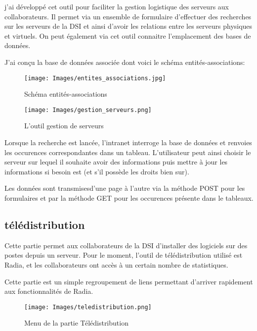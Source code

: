 j'ai développé cet outil pour faciliter la gestion logistique des
serveurs aux collaborateurs. Il permet via un ensemble de formulaire
d'effectuer des recherches sur les serveurs de la DSI et ainsi d'avoir
les relations entre les serveurs physiques et virtuels. On peut
également via cet outil connaitre l'emplacement des bases de données.

J'ai conçu la base de données associée dont voici le schéma entités-associations:

\begin{figure}[h]
\begin{center}
\texttt{[image: Images/entites\_associations.jpg]}
\caption{Schéma entités-associations}
\label{Schéma entités-associations}
\end{center}
\end{figure}

\begin{figure}[h]
\begin{center}
\texttt{[image: Images/gestion\_serveurs.png]}
\caption{L'outil gestion de serveurs}
\label{L'outil gestion de serveurs}
\end{center}
\end{figure}



Lorsque la recherche est lancée, l'intranet interroge la base de
données et renvoies les occurences correspondantes dans un
tableau. L'utilisateur peut ainsi choisir le serveur sur lequel il
souhaite avoir des informations puis mettre à jour les informations si
besoin est (et s'il possède les droits bien sur).



Les données sont transmisesd'une page à l'autre via la méthode POST
pour les formulaires et par la méthode GET pour les occurences
présente dans le tableaux.

\subsection{télédistribution}

Cette partie permet aux collaborateurs de la DSI d'installer des
logiciels sur des postes depuis un serveur. Pour le moment, l'outil de
télédistribution utilisé est Radia, et les collaborateurs ont accès à
un certain nombre de statistiques. 

Cette partie est un simple regroupement de liens permettant d'arriver
rapidement aux fonctionnalités de Radia.

\begin{figure}[h]
\begin{center}
\texttt{[image: Images/teledistribution.png]}
\caption{Menu de la partie Télédistribution}
\label{Menu de la partie Télédistribution}
\end{center}
\end{figure}


